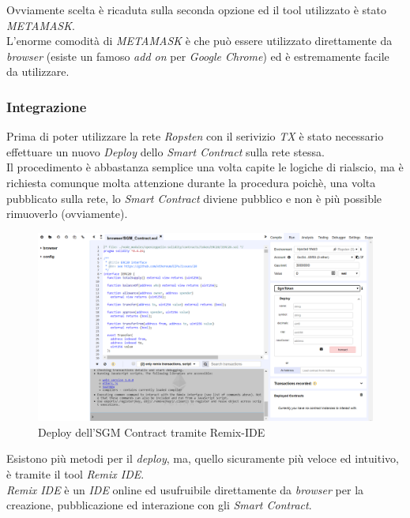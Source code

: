 \documentclass[11pt]{thesistemp}
\begin{document}
Ovviamente scelta è ricaduta sulla seconda opzione ed il tool utilizzato è stato \textit{METAMASK}.\\
L'enorme comodità di \textit{METAMASK} è che può essere utilizzato direttamente da \textit{browser} (esiste un famoso \textit{add on} per \textit{Google Chrome}) ed è estremamente facile da utilizzare.
\pagebreak

\subsubsection{Integrazione}
Prima di poter utilizzare la rete \textit{Ropsten} con il serivizio \textit{TX} è stato necessario effettuare un nuovo \textit{Deploy} dello \textit{Smart Contract} sulla rete stessa.\\
Il procedimento è abbastanza semplice una volta capite le logiche di rialscio, ma è richiesta comunque molta attenzione durante la procedura poichè, una volta pubblicato sulla rete, lo \textit{Smart Contract} diviene pubblico e non è più possible rimuoverlo (ovviamente).\\
\begin{figure}[h]
    \centering
    \includegraphics[scale=0.4]{sgm-contract-deploy.png}
        \caption{Deploy dell'SGM Contract tramite Remix-IDE}
    \label{fig:sgm-contract-deploy}
\end{figure}
\linebreak
Esistono più metodi per il \textit{deploy}, ma, quello sicuramente più veloce ed intuitivo, è tramite il tool \textit{Remix IDE}.\\
\textit{Remix IDE} è un \textit{IDE} online ed usufruibile direttamente da \textit{browser} per la creazione, pubblicazione ed interazione con gli \textit{Smart Contract}.\\
\end{document}
